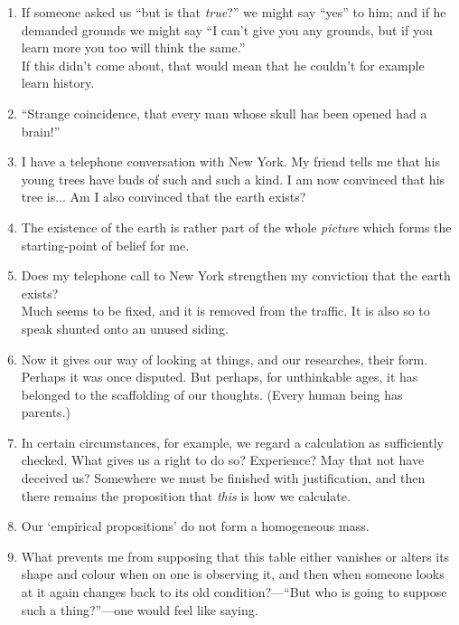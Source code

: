 \documentclass{book}
\begin{document}
\begin{enumerate}
\item
If someone asked us ``but is that \emph{true}?'' we might say ``yes'' to him;
and if he demanded grounds we might say ``I can't give you any grounds, but if
you learn more you too will think the same.'' \\
If this didn't come about, that would mean that he couldn't for example learn
history.

\item
``Strange coincidence, that every man whose skull has been opened had a
brain!''

\item
I have a telephone conversation with New York. My friend tells me that his
young trees have buds of such and such a kind. I am now convinced that his tree
is... Am I also convinced that the earth exists?

\item
The existence of the earth is rather part of the whole \emph{picture} which
forms the starting-point of belief for me.

\item
Does my telephone call to New York strengthen my conviction that the earth
exists? \\
Much seems to be fixed, and it is removed from the traffic. It is also so to
speak shunted onto an unused siding.

\item
Now it gives our way of looking at things, and our researches, their form.
Perhaps it was once disputed. But perhaps, for unthinkable ages, it has
belonged to the scaffolding of our thoughts. (Every human being has parents.)

\item
In certain circumstances, for example, we regard a calculation as sufficiently
checked. What gives us a right to do so? Experience? May that not have deceived
us? Somewhere we must be finished with justification, and then there remains
the proposition that \emph{this} is how we calculate.

\item
Our `empirical propositions' do not form a homogeneous mass.

\item
What prevents me from supposing that this table either vanishes or alters its
shape and colour when on one is observing it, and then when someone looks at it
again changes back to its old condition?---``But who is going to suppose such a
thing?''---one would feel like saying.


\end{enumerate}
\end{document}
